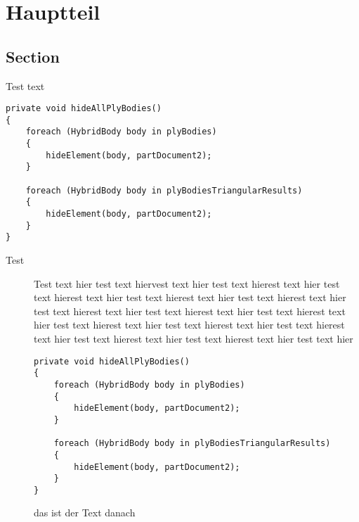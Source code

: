 \documentclass[pdftex,
                                                                final,
                                                                10pt,
                                                                numbers=noenddot,
                                                                a4paper,
                                                                pagesize,
                                                                oneside,
                                                                ngerman,
                                                                parskip=full-]{scrreprt}
\begin{document}
\chapter{Hauptteil}

\section{Section}
Test text

\begin{lstlisting}[caption=Titel des Codes, label=lst, captionpos=t]
private void hideAllPlyBodies()
{
    foreach (HybridBody body in plyBodies)
    {
        hideElement(body, partDocument2);
    }

    foreach (HybridBody body in plyBodiesTriangularResults)
    {
        hideElement(body, partDocument2);
    }
}
\end{lstlisting}

\begin{description}
        \item[Test] Test text hier test text hiervest text hier test text hierest text hier test text hierest text hier test text hierest text hier test text hierest text hier test text hierest text hier test text hierest text hier test text hierest text hier test text hierest text hier test text hierest text hier test text hierest text hier test text hierest text hier test text hierest text hier test text hier
        
\begin{lstlisting}[caption=Titel des Codes, label=lst, captionpos=t]
private void hideAllPlyBodies()
{
    foreach (HybridBody body in plyBodies)
    {
        hideElement(body, partDocument2);
    }

    foreach (HybridBody body in plyBodiesTriangularResults)
    {
        hideElement(body, partDocument2);
    }
}
\end{lstlisting}

das ist der Text danach

\end{description}
\end{document}
